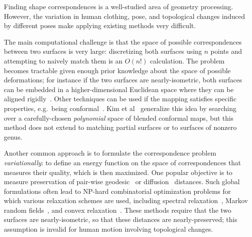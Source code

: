 \documentclass[10pt,twocolumn,letterpaper]{article}
\begin{document}
Finding shape correspondences is a well-studied area of geometry processing. However, the variation in human clothing, pose, and topological changes induced by different poses make applying existing methods very difficult.%

The main computational challenge is that the space of possible correspondences between two surfaces is very large: discretizing both surfaces using $n$ points and attempting to naively match them is an $O(n!)$ calculation. The problem becomes tractable given enough prior knowledge about the space of possible deformations; for instance if the two surfaces are nearly-isometric, both surfaces can be embedded in a higher-dimensional Euclidean space where they can be aligned rigidly~\cite{Elad:2003}. Other techniques can be used if the mapping satisfies specific properties, e.g.~being conformal~\cite{Lipman:2009:MVS,Kim10}. Kim et al~\cite{Kim11} generalize this idea by searching over a carefully-chosen \emph{polynomial} space of blended conformal maps, but this method does not extend to matching partial surfaces or to surfaces of nonzero genus.
  
Another common approach is to formulate the correspondence problem \emph{variationally}: to define an energy function on the space of correspondences that measures their quality, which is then maximized. One popular objective is to measure preservation of pair-wise geodesic~\cite{Bronstein:2006} or diffusion~\cite{Bronstein:2010} distances. Such global formulations often lead to NP-hard combinatorial optimization problems for which various relaxation schemes are used, including spectral relaxation~\cite{Leordeanu:2005:STC}, Markov random fields~\cite{Anguelov:2004}, and convex relaxation~\cite{Windheuser:2011,chen15}. These methods require that the two surfaces are nearly-isometric, so that these distances are nearly-preserved; this assumption is invalid for human motion involving topological changes.
\end{document}
